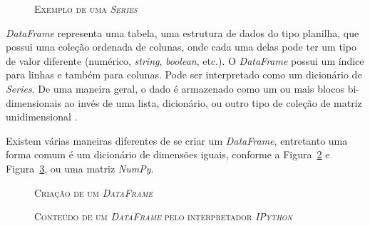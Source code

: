\begin{figure}[h!]
	\centering
	\caption{\textsc{Exemplo de uma \textit{Series}}}
	\vspace{-0.3cm}
	\label{pandas-series}
\end{figure}

\textit{DataFrame} representa uma tabela, uma estrutura de dados do tipo planilha, que possui uma coleção ordenada de colunas, onde cada uma delas pode ter um tipo de valor diferente (numérico, \textit{string}, \textit{boolean}, etc.). O \textit{DataFrame} possui um índice para linhas e também para colunas. Pode ser interpretado como um dicionário de \textit{Series}. De uma maneira geral, o dado é armazenado como um ou mais blocos bi-dimensionais ao invés de uma lista, dicionário, ou outro tipo de coleção de matriz unidimensional \cite{python-analysis}.

Existem várias maneiras diferentes de se criar um \textit{DataFrame}, entretanto uma forma comum é um dicionário de dimensões iguais, conforme a Figura~\ref{pandas-dataframe} e Figura~\ref{pandas-dataframe2},  ou uma matriz \textit{NumPy}.

\begin{figure}[h!]
	\centering
	\caption{\textsc{Criação de um \textit{DataFrame}}}
	\vspace{-0.3cm}
	\label{pandas-dataframe}
\end{figure}

\begin{figure}[h!]
	\centering
	\caption{\textsc{Conteúdo de um \textit{DataFrame} pelo interpretador \textit{IPython}}}
	\vspace{-0.3cm}
	\label{pandas-dataframe2}
\end{figure}

